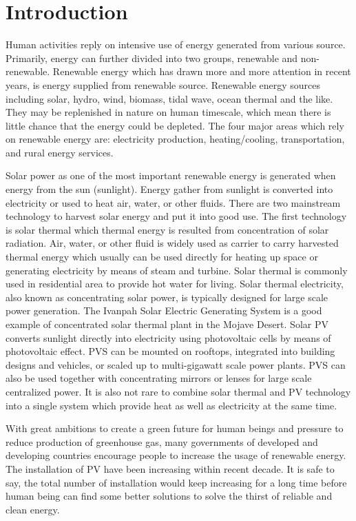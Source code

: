 \chapter{Introduction}\label{ch:intro}

Human activities reply on intensive use of energy generated from various source. Primarily, energy can further divided into two groups, renewable and non-renewable. Renewable energy which has drawn more and more attention in recent years, is energy supplied from renewable source. Renewable energy sources including solar, hydro, wind, biomass, tidal wave, ocean thermal and the like. They may be replenished in nature on human timescale, which mean there is little chance that the energy could be depleted. The four major areas which rely on renewable energy are: electricity production, heating/cooling, transportation, and rural energy services. 

Solar power as one of the most important renewable energy is generated when energy from the sun (sunlight). Energy gather from sunlight is converted into electricity or used to heat air, water, or other fluids. There are two mainstream technology to harvest solar energy and put it into good use. The first technology is solar thermal which thermal energy is resulted from concentration of solar radiation. Air, water, or other fluid is widely used as carrier to carry harvested thermal energy which usually can be used directly for heating up space or  generating electricity by means of steam and turbine. Solar thermal is commonly used in residential area to provide hot water for living. Solar thermal electricity, also known as concentrating solar power, is typically designed for large scale power generation. The Ivanpah Solar Electric Generating System is a good example of concentrated solar thermal plant in the Mojave Desert. Solar \gls{PV} converts sunlight directly into electricity using photovoltaic cells by means of photovoltaic effect. \gls{PVS} can be mounted on rooftops, integrated into building designs and vehicles, or scaled up to multi-gigawatt scale power plants. \gls{PVS} can also be used together with concentrating mirrors or lenses for large scale centralized power. It is also not rare to combine solar thermal and \gls{PV} technology into a single system which provide heat as well as electricity at the same time.

With great ambitions to create a  green future for human beings and pressure to reduce production of greenhouse gas, many governments of developed and developing countries encourage people to increase the usage of renewable energy. The installation of \gls{PV} have been increasing within recent decade. It is safe to say, the total number of installation would keep increasing for a long time before human being can find some better solutions to solve the thirst of reliable and clean energy. 

